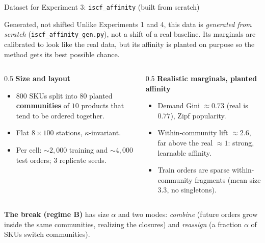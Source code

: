 \documentclass[11pt,aspectratio=169]{beamer}
\newcommand{\term}[1]{\textcolor{blue!60!black}{\textbf{#1}}}
\begin{document}
\begin{frame}{Dataset for Experiment 3: \texttt{iscf\_affinity} (built from scratch)}
  \begin{block}{Generated, not shifted}
  Unlike Experiments 1 and 4, this data is \emph{generated from scratch} (\texttt{iscf\_affinity\_gen.py}), not a shift of a real baseline. Its marginals are calibrated to look like the real data, but its affinity is planted on purpose so the method gets its best possible chance.
  \end{block}
  \begin{columns}
  \begin{column}{0.5\textwidth}
  \footnotesize
  \textbf{Size and layout}
  \begin{itemize}
    \item $800$ SKUs split into $80$ planted \term{communities} of $10$ products that tend to be ordered together.
    \item Flat $8\times100$ stations, $\kappa$-invariant.
    \item Per cell: $\sim\!2{,}000$ training and $\sim\!4{,}000$ test orders; $3$ replicate seeds.
  \end{itemize}
  \end{column}
  \begin{column}{0.5\textwidth}
  \footnotesize
  \textbf{Realistic marginals, planted affinity}
  \begin{itemize}
    \item Demand Gini $\approx 0.73$ (real is $0.77$), Zipf popularity.
    \item Within-community lift $\approx 2.6$, far above the real $\approx 1$: strong, learnable affinity.
    \item Train orders are sparse within-community fragments (mean size $3.3$, no singletons).
  \end{itemize}
  \end{column}
  \end{columns}
  \vspace{1mm}
  \footnotesize \textbf{The break (regime B)} has size $\alpha$ and two modes: \emph{combine} (future orders grow inside the same communities, realizing the closures) and \emph{reassign} (a fraction $\alpha$ of SKUs switch communities).
\end{frame}
\end{document}
